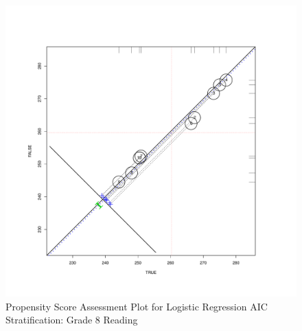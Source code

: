 \documentclass[letterpaper,12p,twoside]{article} %
\begin{document}
\clearpage
\begin{figure}
\begin{center}
\includegraphics[height=.4\textheight,width=.4\textheight]{../Figures2009/g8read-circpsa10-AIC.pdf}
\caption{Propensity Score Assessment Plot for Logistic Regression AIC Stratification: Grade 8 Reading}
\end{center}
\end{figure}


\end{document}
